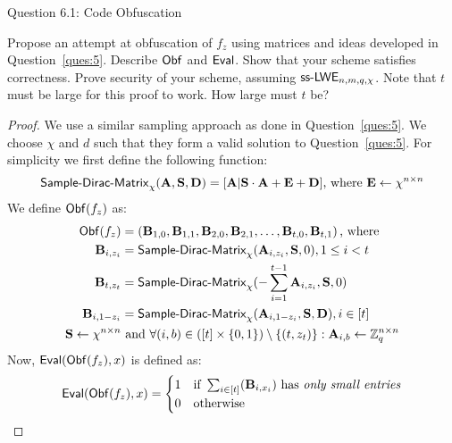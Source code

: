 \begin{solution}{Question 6.1: Code Obfuscation}\label{ques:61}
    \begin{question}
        Propose an attempt at obfuscation of $f_z$ using matrices and ideas developed in Question~\ref{ques:5}. Describe $\mathsf{Obf}$ and $\mathsf{Eval}$. Show that your scheme satisfies correctness. Prove security of your scheme, assuming $\mathsf{ss\text{-}LWE}_{n,m,q,\chi}$. Note that $t$ must be large for this proof to work. How large must $t$ be?
    \end{question}
    \tcblower{}
    \begin{proof}
        We use a similar sampling approach as done in Question~\ref{ques:5}. We choose $\chi$ and $d$ such that they form a valid solution to Question~\ref{ques:5}. For simplicity we first define the following function:
        \begin{equation}
            \mathsf{Sample\text{-}Dirac\text{-}Matrix}_\chi(\mathbf{A}, \mathbf{S}, \mathbf{D}) = [\mathbf{A} | \mathbf{S}\cdot\mathbf{A} + \mathbf{E} + \mathbf{D}]\text{, where }\mathbf{E} \gets \chi^{n\times n}
        \end{equation}
        We define $\mathsf{Obf}(f_z)$ as:
        \begin{equation}
            \begin{split}
                \mathsf{Obf}(f_z) &= \left(\mathbf{B}_{1,0}, \mathbf{B}_{1,1}, \mathbf{B}_{2,0}, \mathbf{B}_{2,1}, \ldots, \mathbf{B}_{t,0}, \mathbf{B}_{t,1}\right)\text{, where}\\
                \mathbf{B}_{i,z_i} &= \mathsf{Sample\text{-}Dirac\text{-}Matrix}_\chi(\mathbf{A}_{i,z_i}, \mathbf{S}, 0), 1\leq i < t\\
                \mathbf{B}_{t,z_t} &= \mathsf{Sample\text{-}Dirac\text{-}Matrix}_\chi(-\sum_{i=1}^{t-1}\mathbf{A}_{i,z_i}, \mathbf{S}, 0)\\
                \mathbf{B}_{i,1-z_i} &= \mathsf{Sample\text{-}Dirac\text{-}Matrix}_\chi(\mathbf{A}_{i,1-z_i}, \mathbf{S}, \mathbf{D}), i\in [t]\\
                \mathbf{S}\gets\chi^{n\times n}&\text{ and }\forall (i, b)\in \left([t]\times\{0, 1\}\right)\setminus\{(t, z_t)\}: \mathbf{A}_{i,b}\gets \mathbb{Z}_q^{n\times n}
            \end{split}
        \end{equation}
        Now, $\mathsf{Eval}(\mathsf{Obf}(f_z), x)$ is defined as:
        \begin{equation}
            \mathsf{Eval}(\mathsf{Obf}(f_z), x) =
            \begin{cases}
                1&\text{if }\sum_{i\in[t]}(\mathbf{B}_{i,x_i})\text{ has \textit{only small entries}}\\
                0&\text{otherwise}
            \end{cases}
        \end{equation}

\end{proof}
\end{solution}
